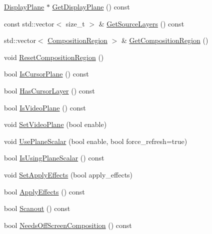 \begin{DoxyCompactItemize}
\item 
\mbox{\hyperlink{classhwcomposer_1_1DisplayPlane}{Display\+Plane}} $\ast$ \mbox{\hyperlink{classhwcomposer_1_1DisplayPlaneState_a80539fcee6c9dff4f48f03f27474c7b0}{Get\+Display\+Plane}} () const
\item 
const std\+::vector$<$ size\+\_\+t $>$ \& \mbox{\hyperlink{classhwcomposer_1_1DisplayPlaneState_a7b64f85b76a5d69e28cdec6ad6012c85}{Get\+Source\+Layers}} () const
\item 
std\+::vector$<$ \mbox{\hyperlink{structhwcomposer_1_1CompositionRegion}{Composition\+Region}} $>$ \& \mbox{\hyperlink{classhwcomposer_1_1DisplayPlaneState_a82bcf9816ab0727cb9c015b93da6458c}{Get\+Composition\+Region}} ()
\item 
void \mbox{\hyperlink{classhwcomposer_1_1DisplayPlaneState_a075df3470b1301fbbfa05b4b6cd98168}{Reset\+Composition\+Region}} ()
\item 
bool \mbox{\hyperlink{classhwcomposer_1_1DisplayPlaneState_ac555ba37fe851fee55a7ffda0b5be599}{Is\+Cursor\+Plane}} () const
\item 
bool \mbox{\hyperlink{classhwcomposer_1_1DisplayPlaneState_ae7bb8080cc8ee5b5361d2a024a806192}{Has\+Cursor\+Layer}} () const
\item 
bool \mbox{\hyperlink{classhwcomposer_1_1DisplayPlaneState_a6d938a233ed083ac445272d3ac068a48}{Is\+Video\+Plane}} () const
\item 
void \mbox{\hyperlink{classhwcomposer_1_1DisplayPlaneState_a192ea4a1150ab368a53ac75f8caa888a}{Set\+Video\+Plane}} (bool enable)
\item 
void \mbox{\hyperlink{classhwcomposer_1_1DisplayPlaneState_aa09162c79c85636721823091e7af9f66}{Use\+Plane\+Scalar}} (bool enable, bool force\+\_\+refresh=true)
\item 
bool \mbox{\hyperlink{classhwcomposer_1_1DisplayPlaneState_a15e55a34c3b5ca53096f50c7b499483b}{Is\+Using\+Plane\+Scalar}} () const
\item 
void \mbox{\hyperlink{classhwcomposer_1_1DisplayPlaneState_a4fd65b7fd1dacb02778349a95c6adbaf}{Set\+Apply\+Effects}} (bool apply\+\_\+effects)
\item 
bool \mbox{\hyperlink{classhwcomposer_1_1DisplayPlaneState_a3f56e95cfe47bc77b72682827930ed2c}{Apply\+Effects}} () const
\item 
bool \mbox{\hyperlink{classhwcomposer_1_1DisplayPlaneState_a69b12573e464516fa0a96fc55eed8ba8}{Scanout}} () const
\item 
bool \mbox{\hyperlink{classhwcomposer_1_1DisplayPlaneState_aa560fed729358bea301f0dcfee1b4b98}{Needs\+Off\+Screen\+Composition}} () const

\end{DoxyCompactItemize}
